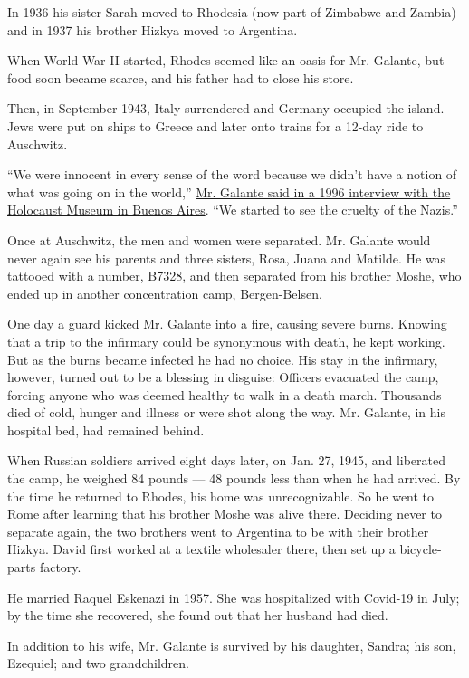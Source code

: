In 1936 his sister Sarah moved to Rhodesia (now part of Zimbabwe and
Zambia) and in 1937 his brother Hizkya moved to Argentina.

When World War II started, Rhodes seemed like an oasis for Mr. Galante,
but food soon became scarce, and his father had to close his store.

Then, in September 1943, Italy surrendered and Germany occupied the
island. Jews were put on ships to Greece and later onto trains for a
12-day ride to Auschwitz.

``We were innocent in every sense of the word because we didn't have a
notion of what was going on in the world,''
\href{https://www.youtube.com/watch?v=_GNGerlidHI}{Mr. Galante said in a
1996 interview with the Holocaust Museum in Buenos Aires}. ``We started
to see the cruelty of the Nazis.''

Once at Auschwitz, the men and women were separated. Mr. Galante would
never again see his parents and three sisters, Rosa, Juana and Matilde.
He was tattooed with a number, B7328, and then separated from his
brother Moshe, who ended up in another concentration camp,
Bergen-Belsen.

One day a guard kicked Mr. Galante into a fire, causing severe burns.
Knowing that a trip to the infirmary could be synonymous with death, he
kept working. But as the burns became infected he had no choice. His
stay in the infirmary, however, turned out to be a blessing in disguise:
Officers evacuated the camp, forcing anyone who was deemed healthy to
walk in a death march. Thousands died of cold, hunger and illness or
were shot along the way. Mr. Galante, in his hospital bed, had remained
behind.

When Russian soldiers arrived eight days later, on Jan. 27, 1945, and
liberated the camp, he weighed 84 pounds --- 48 pounds less than when he
had arrived. By the time he returned to Rhodes, his home was
unrecognizable. So he went to Rome after learning that his brother Moshe
was alive there. Deciding never to separate again, the two brothers went
to Argentina to be with their brother Hizkya. David first worked at a
textile wholesaler there, then set up a bicycle-parts factory.

He married Raquel Eskenazi in 1957. She was hospitalized with Covid-19
in July; by the time she recovered, she found out that her husband had
died.

In addition to his wife, Mr. Galante is survived by his daughter,
Sandra; his son, Ezequiel; and two grandchildren.

